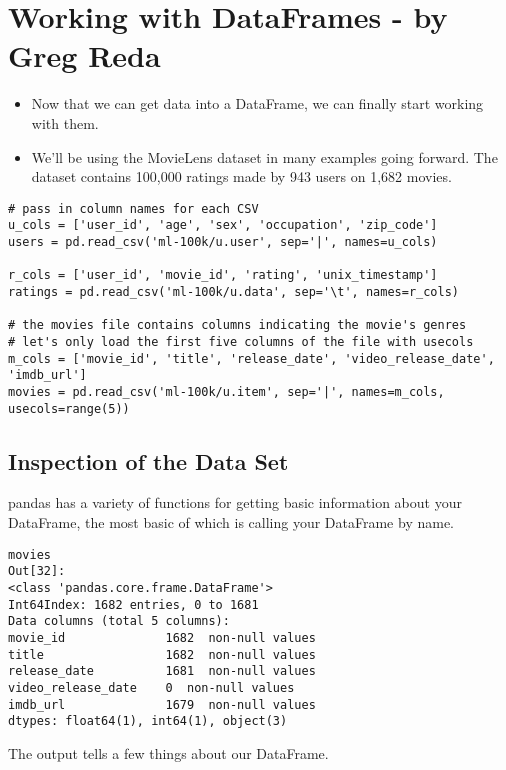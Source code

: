 \documentclass[]{article}
\title{}
\author{}
\begin{document}
\section{Working with DataFrames - by Greg Reda}

\begin{itemize}
\item Now that we can get data into a DataFrame, we can finally start working with them.
\item 
We'll be using the MovieLens dataset in many examples going forward. The dataset contains 100,000 ratings made by 943 users on 1,682 movies.

\end{itemize}
\begin{framed}
\begin{verbatim}
# pass in column names for each CSV
u_cols = ['user_id', 'age', 'sex', 'occupation', 'zip_code']
users = pd.read_csv('ml-100k/u.user', sep='|', names=u_cols)

r_cols = ['user_id', 'movie_id', 'rating', 'unix_timestamp']
ratings = pd.read_csv('ml-100k/u.data', sep='\t', names=r_cols)

# the movies file contains columns indicating the movie's genres
# let's only load the first five columns of the file with usecols
m_cols = ['movie_id', 'title', 'release_date', 'video_release_date', 'imdb_url']
movies = pd.read_csv('ml-100k/u.item', sep='|', names=m_cols, 
usecols=range(5))
\end{verbatim}
\end{framed}
\subsection{Inspection of the Data Set}

pandas has a variety of functions for getting basic information about your DataFrame, the most basic of which is calling your DataFrame by name.
\begin{verbatim}
movies
Out[32]:
<class 'pandas.core.frame.DataFrame'>
Int64Index: 1682 entries, 0 to 1681
Data columns (total 5 columns):
movie_id              1682  non-null values
title                 1682  non-null values
release_date          1681  non-null values
video_release_date    0  non-null values
imdb_url              1679  non-null values
dtypes: float64(1), int64(1), object(3)
\end{verbatim}
The output tells a few things about our DataFrame.
\end{document}
